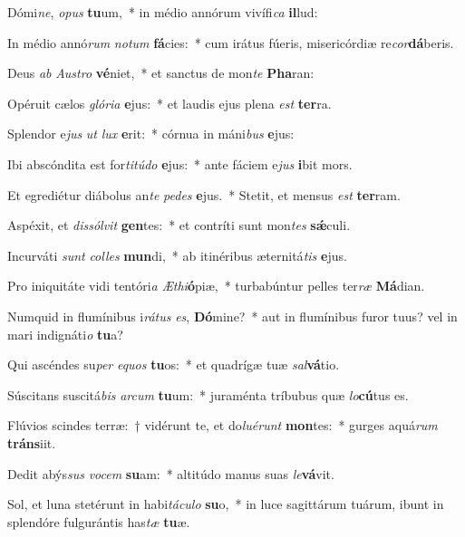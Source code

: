 \item Dómi\textit{ne}, \textit{o}\textit{pus} \textbf{tu}um,~* in médio annórum vivífi\textit{ca} \textbf{il}lud:
\item In médio annó\textit{rum} \textit{no}\textit{tum} \textbf{fá}cies:~* cum irátus fúeris, misericórdiæ re\textit{cor}\textbf{dá}beris.
\item Deus \textit{ab} \textit{Aus}\textit{tro} \textbf{vé}niet,~* et sanctus de mon\textit{te} \textbf{Pha}ran:
\item Opéruit cælos \textit{gló}\textit{ri}\textit{a} \textbf{e}jus:~* et laudis ejus plena \textit{est} \textbf{ter}ra.
\item Splendor e\textit{jus} \textit{ut} \textit{lux} \textbf{e}rit:~* córnua in máni\textit{bus} \textbf{e}jus:
\item Ibi abscóndita est for\textit{ti}\textit{tú}\textit{do} \textbf{e}jus:~* ante fáciem e\textit{jus} \textbf{i}bit mors.
\item Et egrediétur diábolus an\textit{te} \textit{pe}\textit{des} \textbf{e}jus.~* Stetit, et mensus \textit{est} \textbf{ter}ram.
\item Aspéxit, et \textit{dis}\textit{sól}\textit{vit} \textbf{gen}tes:~* et contríti sunt mon\textit{tes} \textbf{sǽ}culi.
\item Incurváti \textit{sunt} \textit{col}\textit{les} \textbf{mun}di,~* ab itinéribus æternitá\textit{tis} \textbf{e}jus.
\item Pro iniquitáte vidi tentóri\textit{a} \textit{Æ}\textit{thi}\textbf{ó}piæ,~* turbabúntur pelles ter\textit{ræ} \textbf{Má}dian.
\item Numquid in flumínibus i\textit{rá}\textit{tus} \textit{es}, \textbf{Dó}mine?~* aut in flumínibus furor tuus? vel in mari indignáti\textit{o} \textbf{tu}a?
\item Qui ascéndes su\textit{per} \textit{e}\textit{quos} \textbf{tu}os:~* et quadrígæ tuæ \textit{sal}\textbf{vá}tio.
\item Súscitans suscitá\textit{bis} \textit{ar}\textit{cum} \textbf{tu}um:~* juraménta tríbubus quæ \textit{lo}\textbf{cú}tus es.
\item Flúvios scindes terræ:~† vidérunt te, et do\textit{lu}\textit{é}\textit{runt} \textbf{mon}tes:~* gurges aquá\textit{rum} \textbf{tráns}iit.
\item Dedit abýs\textit{sus} \textit{vo}\textit{cem} \textbf{su}am:~* altitúdo manus suas \textit{le}\textbf{vá}vit.
\item Sol, et luna stetérunt in habi\textit{tá}\textit{cu}\textit{lo} \textbf{su}o,~* in luce sagittárum tuárum, ibunt in splendóre fulgurántis has\textit{tæ} \textbf{tu}æ.
